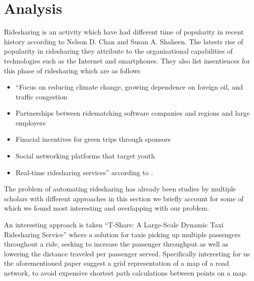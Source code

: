 \section{Analysis}
Ridesharing is an activity which have had different time of popularity in recent history according to Nelson D. Chan and Susan A. Shaheen\cite{doi:10.1080/01441647.2011.621557}.
The latests rise of popularity in ridesharing they attribute to the organisational capabilities of technologies such as the Internet and smartphones.
They also list insentiences for this phase of ridesharing which are as follows 
\begin{itemize}
  \item ``Focus on reducing climate change, growing dependence on foreign oil, and traffic congestion
  \item Partnerships between ridematching software companies and regions and large employers
  \item Finacial incentives for green trips through sponsors
  \item Social networking platforms that target youth
  \item Real-time ridesharing services'' according to \cite{doi:10.1080/01441647.2011.621557}.
\end{itemize}


The problem of automating ridesharing has already been studies by multiple scholars with different approaches in this section we briefly account for some of which we found most interesting and overlapping with our problem. 

An interesting approach is taken ``T-Share: A Large-Scale Dynamic Taxi Ridesharing Service'' where a solution for taxis picking up multiple passengers throughout a ride, seeking to increase the passenger throughput as well as lowering the distance traveled per passenger served\cite{ShuoMa2013}.
Specifically interesting for us the aforementioned paper suggest a grid representation of a map of a road network, to avoid expensive shortest path calculations between points on a map.